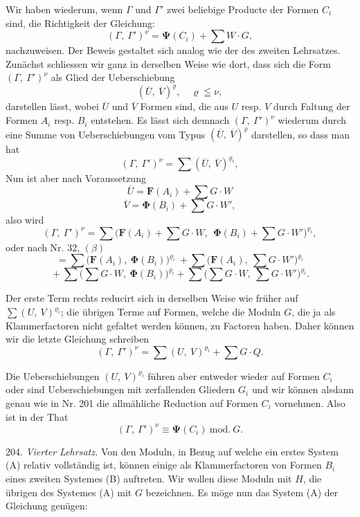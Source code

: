 Wir haben wiederum, wenn $\Gamma$ und $\Gamma'$ zwei beliebige
Producte der Formen $C_i$ sind, die Richtigkeit der Gleichung:
\[ (\Gamma,\ \Gamma')^\nu = \boldsymbol{\Psi}(C_i) + \sum W\cdot G, \]
nachzuweisen. Der Beweis gestaltet sich analog wie der des zweiten
Lehrsatzes. Zunächst schliessen wir ganz in derselben Weise wie
dort, dass sich die Form $(\Gamma,\ \Gamma')^\nu$ als Glied der
Ueberschiebung
\[ (\overline U,\ \overline V)^\varrho,\quad \varrho \leqq \nu, \]
darstellen lässt, wobei $\overline U$ und $\overline V$ Formen sind, die
aus $U$ resp. $V$ durch Faltung der Formen $A_i$ resp. $B_i$
entstehen. Es lässt sich demnach $(\Gamma,\ \Gamma')^\nu$ wiederum
durch eine Summe von Ueberschiebungen vom Typus $(\overline U,\ \overline V)^\varrho$
darstellen, so dass man hat
\[ (\Gamma,\ \Gamma')^\nu = \sum (\overline U,\ \overline V)^{\varrho_i}, \]
Nun ist aber nach Voraussetzung
\[ \overline U = \boldsymbol{F}(A_i) + \sum G\cdot W \]
\[ \overline V = \boldsymbol{\Phi}(B_i) + \sum G\cdot W', \]
also wird
\[ (\Gamma,\ \Gamma')^\nu = \sum \big(\boldsymbol{F}(A_i) + \sum G\cdot W,\ \ \boldsymbol{\Phi}(B_i)+\sum G\cdot W'\big)^{\varrho_i}, \]
oder nach Nr. 32, $(\beta)$
\[ = \sum \big(\boldsymbol{F}(A_i),\ \boldsymbol{\Phi}(B_i)\big)^{\varrho_i} \ + \sum \big(\boldsymbol{F}(A_i),\ \sum G\cdot W'\big)^{\varrho_i} \]
\[ {}+ \sum \big(\sum G\cdot W,\ \boldsymbol{\Phi}(B_i)\big)^{\varrho_i} + \sum \big(\sum G\cdot W,\ \sum G\cdot W'\big)^{\varrho_i}. \]

Der erste Term rechts reducirt sich in derselben Weise wie früher
auf $\sum (U,\ V)^{\varrho_i}$; die übrigen Terme auf Formen, welche die
Moduln $G$, die ja als Klammerfactoren nicht gefaltet werden können,
zu Factoren haben. Daher können wir die letzte Gleichung schreiben
\[ (\Gamma,\ \Gamma')^\nu = \sum (U,\ V)^{\varrho_i} + \sum G\cdot Q. \]

Die Ueberschiebungen $(U,\ V)^{\varrho_i}$ führen aber entweder wieder
auf Formen $C_i$ oder sind Ueberschiebungen mit zerfallenden
Gliedern $G_i$ und wir können alsdann genau wie in Nr. 201 die
allmähliche Reduction auf Formen $C_i$ vornehmen. Also ist in der
That
\[ (\Gamma,\ \Gamma')^\nu \equiv \boldsymbol{\Psi}(C_i)\ \mathrm{mod.}\ G. \]


204. \textit{Vierter Lehrsatz.} Von den Moduln, in Bezug auf welche ein
erstes System (A) relativ vollständig ist, können einige als Klammerfactoren
von Formen $B_i$ eines zweiten Systemes (B) auftreten. Wir wollen diese
Moduln mit $H$, die übrigen des Systemes (A) mit $G$ bezeichnen. Es möge
nun das System (A) der Gleichung genügen:

